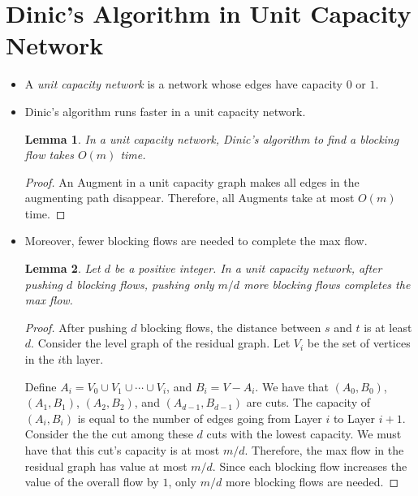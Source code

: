 \documentclass[10pt]{article}
\newtheorem{lemma}{Lemma}[section]
\begin{document}
  \section{Dinic's Algorithm in Unit Capacity Network} %
  \label{sec:dinic_s_algorithm_in_unit_capacity_graph}
    \begin{itemize}
      \item A \emph{unit capacity network} is a network whose
        edges have capacity $0$ or $1$.
      
      \item Dinic's algorithm runs faster in a unit capacity network.
      
        \begin{lemma}
          In a unit capacity network, Dinic's algorithm to
          find a blocking flow takes $O(m)$ time.
        \end{lemma}
        \begin{proof}
          An Augment in a unit capacity graph makes
          all edges in the augmenting path disappear.
          Therefore, all Augments take at most $O(m)$ time.
        \end{proof}
        
      \item Moreover, fewer blocking flows are needed to
        complete the max flow.
        
        \begin{lemma}
          Let $d$ be a positive integer. In a unit capacity
          network, after pushing $d$ blocking flows,
          pushing only $m/d$ more blocking flows completes
          the max flow.
        \end{lemma}
        
        \begin{proof}
          After pushing $d$ blocking flows, the distance
          between $s$ and $t$ is at least $d$. Consider the level 
          graph of the residual graph. Let $V_i$ be the set of 
          vertices in the $i$th layer.
          
          Define $A_i = V_0 \cup V_1 \cup \dotsb \cup V_i$,
          and $B_i = V - A_i$. We have that
          $(A_0, B_0)$, $(A_1, B_1)$, $(A_2, B_2)$, 
          and $(A_{d-1}, B_{d-1})$ are cuts.
          The capacity of $(A_i, B_i)$ is equal 
          to the number of edges going from Layer $i$
          to Layer $i+1$. Consider the the cut
          among these $d$ cuts with the lowest capacity.
          We must have that this cut's capacity
          is at most $m/d$. Therefore, the 
          max flow in the residual graph has value
          at most $m/d$. Since each blocking flow increases
          the value of the overall flow by $1$,
          only $m/d$ more blocking flows are needed.
        \end{proof}
        

\end{itemize}
\end{document}
